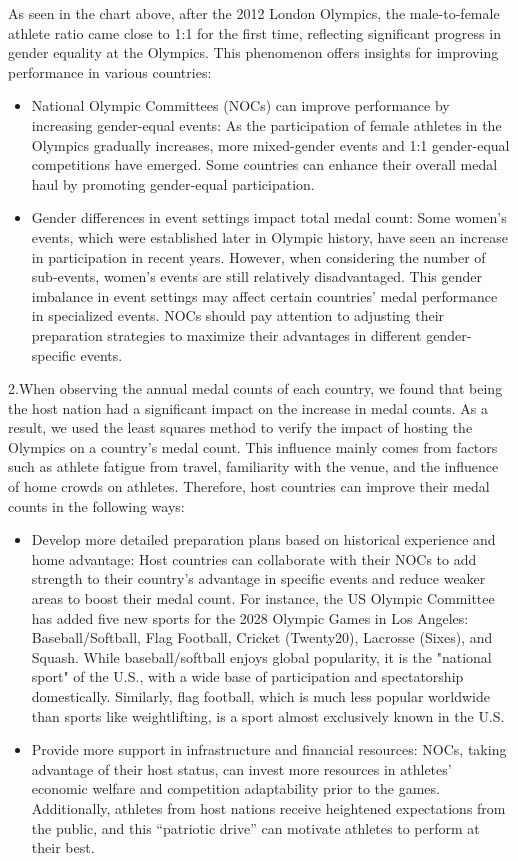 \documentclass{mcmthesis}
\begin{document}
As seen in the chart above, after the 2012 London Olympics, the male-to-female athlete ratio came close to 1:1 for the first time, reflecting significant progress in gender equality at the Olympics. This phenomenon offers insights for improving performance in various countries:

\begin{itemize}   
    \item  National Olympic Committees (NOCs) can improve performance by increasing gender-equal events: As the participation of female athletes in the Olympics gradually increases, more mixed-gender events and 1:1 gender-equal competitions have emerged. Some countries can enhance their overall medal haul by promoting gender-equal participation.
    \item Gender differences in event settings impact total medal count: Some women's events, which were established later in Olympic history, have seen an increase in participation in recent years. However, when considering the number of sub-events, women's events are still relatively disadvantaged. This gender imbalance in event settings may affect certain countries' medal performance in specialized events. NOCs should pay attention to adjusting their preparation strategies to maximize their advantages in different gender-specific events.
\end{itemize}  

    2.When observing the annual medal counts of each country, we found that being the host nation had a significant impact on the increase in medal counts. As a result, we used the least squares method to verify the impact of hosting the Olympics on a country's medal count. This influence mainly comes from factors such as athlete fatigue from travel, familiarity with the venue, and the influence of home crowds on athletes. Therefore, host countries can improve their medal counts in the following ways:

\begin{itemize}   
    \item  Develop more detailed preparation plans based on historical experience and home advantage: Host countries can collaborate with their NOCs to add strength to their country's advantage in specific events and reduce weaker areas to boost their medal count. For instance, the US Olympic Committee has added five new sports for the 2028 Olympic Games in Los Angeles:  Baseball/Softball, Flag Football, Cricket (Twenty20), Lacrosse (Sixes), and Squash. While baseball/softball enjoys global popularity, it is the "national sport" of the U.S., with a wide base of participation and spectatorship domestically. Similarly, flag football, which is much less popular worldwide than sports like weightlifting, is a sport almost exclusively known in the U.S.
    \item Provide more support in infrastructure and financial resources: NOCs, taking advantage of their host status, can invest more resources in athletes’ economic welfare and competition adaptability prior to the games. Additionally, athletes from host nations receive heightened expectations from the public, and this “patriotic drive” can motivate athletes to perform at their best.
\end{itemize} 
\end{document}
